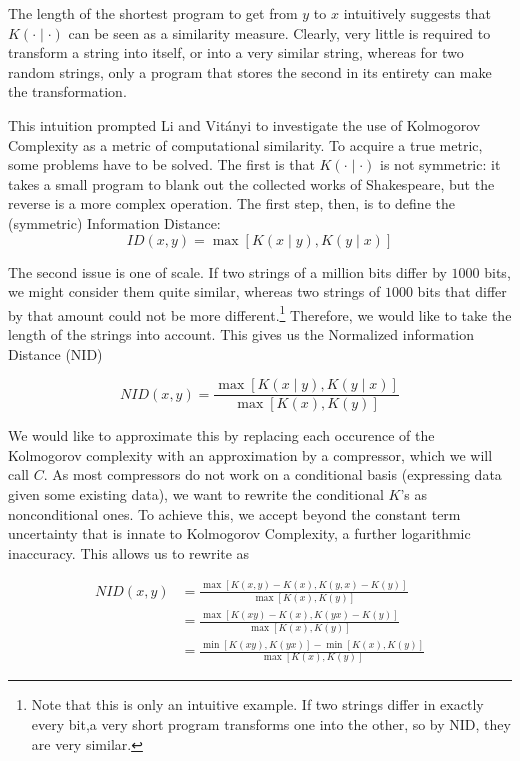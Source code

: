 \documentclass{article}
\begin{document}
The length of the shortest program to get from $y$ to $x$ intuitively suggests that $K(\cdot\mid \cdot)$ can be seen as a similarity measure. Clearly, very little is required to transform a string into itself, or into a very similar string, whereas for two random strings, only a program that stores the second in its entirety can make the transformation.

This intuition prompted Li and Vit{\'a}nyi \cite{li2004similarity} to investigate the use of Kolmogorov Complexity as a metric of computational similarity. To acquire a true metric, some problems have to be solved. The first is that $K(\cdot\mid \cdot)$ is not symmetric: it takes a small program to blank out the collected works of Shakespeare, but the reverse is a more complex operation. The first step, then, is to define the (symmetric) Information Distance:
\[
ID(x, y) = \max \left [K(x\mid y),K(y\mid x) \right ] 
\]  

The second issue is one of scale. If two strings of a million bits differ by $1000$ bits, we might consider them quite similar, whereas two strings of $1000$ bits that differ by that amount could not be more different.\footnote{Note that this is only an intuitive example. If two strings differ in exactly every bit,a very short program transforms one into the other, so by NID, they are very similar.} Therefore, we would like to take the length of the strings into account. This gives us the Normalized information Distance (NID)

\[
NID(x, y) = \frac{\max \left [K(x \mid y),K(y \mid x) \right ] }{\max \left [K(x), K(y) \right ]}
\] 

We would like to approximate this by replacing each occurence of the Kolmogorov complexity with an approximation by a compressor, which we will call $C$. As most compressors do not work on a conditional basis (expressing data given some existing data), we want to rewrite the conditional $K$'s as nonconditional ones. To achieve this, we accept beyond the constant term uncertainty that is innate to Kolmogorov Complexity, a further logarithmic inaccuracy. This allows us to rewrite as

\begin{align*}
NID(x, y)	 &= \frac{\max \left [K(x, y) - K(x),K(y, x) - K(y)\right ] }{\max \left [K(x), K(y) \right ]} \\ 
	&= \frac{\max \left [K(xy) - K(x),K(yx) - K(y)\right ] } {\max \left [K(x), K(y) \right ]} \\
	&= \frac{\min \left [K(xy), K(yx)\right ] - \min \left[K(x), K(y)\right]}{\max \left [K(x), K(y) \right ]} 
\end{align*}
\end{document}
